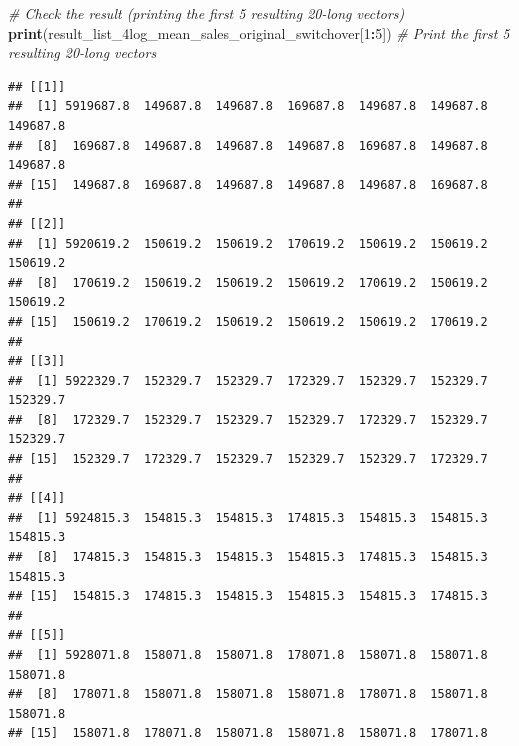 \documentclass[
]{article}
\newenvironment{Shaded}{\begin{snugshade}}{\end{snugshade}}
\newcommand{\CommentTok}[1]{\textcolor[rgb]{0.56,0.35,0.01}{\textit{#1}}}
\newcommand{\DecValTok}[1]{\textcolor[rgb]{0.00,0.00,0.81}{#1}}
\newcommand{\FunctionTok}[1]{\textcolor[rgb]{0.13,0.29,0.53}{\textbf{#1}}}
\newcommand{\NormalTok}[1]{#1}
\newcommand{\SpecialCharTok}[1]{\textcolor[rgb]{0.81,0.36,0.00}{\textbf{#1}}}
\begin{document}
\begin{Shaded}
\begin{Highlighting}[]
\CommentTok{\# Check the result (printing the first 5 resulting 20{-}long vectors)}
\FunctionTok{print}\NormalTok{(result\_list\_4log\_mean\_sales\_original\_switchover[}\DecValTok{1}\SpecialCharTok{:}\DecValTok{5}\NormalTok{])  }\CommentTok{\# Print the first 5 resulting 20{-}long vectors}
\end{Highlighting}
\end{Shaded}

\begin{verbatim}
## [[1]]
##  [1] 5919687.8  149687.8  149687.8  169687.8  149687.8  149687.8  149687.8
##  [8]  169687.8  149687.8  149687.8  149687.8  169687.8  149687.8  149687.8
## [15]  149687.8  169687.8  149687.8  149687.8  149687.8  169687.8
## 
## [[2]]
##  [1] 5920619.2  150619.2  150619.2  170619.2  150619.2  150619.2  150619.2
##  [8]  170619.2  150619.2  150619.2  150619.2  170619.2  150619.2  150619.2
## [15]  150619.2  170619.2  150619.2  150619.2  150619.2  170619.2
## 
## [[3]]
##  [1] 5922329.7  152329.7  152329.7  172329.7  152329.7  152329.7  152329.7
##  [8]  172329.7  152329.7  152329.7  152329.7  172329.7  152329.7  152329.7
## [15]  152329.7  172329.7  152329.7  152329.7  152329.7  172329.7
## 
## [[4]]
##  [1] 5924815.3  154815.3  154815.3  174815.3  154815.3  154815.3  154815.3
##  [8]  174815.3  154815.3  154815.3  154815.3  174815.3  154815.3  154815.3
## [15]  154815.3  174815.3  154815.3  154815.3  154815.3  174815.3
## 
## [[5]]
##  [1] 5928071.8  158071.8  158071.8  178071.8  158071.8  158071.8  158071.8
##  [8]  178071.8  158071.8  158071.8  158071.8  178071.8  158071.8  158071.8
## [15]  158071.8  178071.8  158071.8  158071.8  158071.8  178071.8
\end{verbatim}
\end{document}
